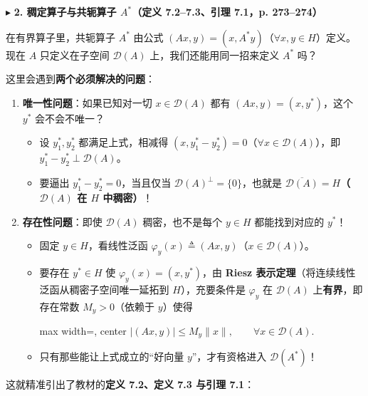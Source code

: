\documentclass[11pt,a4paper]{article}
\providecommand{\tightlist}{\setlength{\itemsep}{2pt}\setlength{\parskip}{0pt}}
\newcommand{\SubSubHeading}[1]{%
  \Needspace{6.5\baselineskip}\vspace{5.5pt}\noindent
  \textcolor{AccentMain}{\scriptsize$\blacktriangleright$}\hspace{4pt}%
  {\small\bfseries\color{AccentMain}#1}\par\nopagebreak[4]\vspace{2.5pt}%
}
\newcommand{\FitDisplayMath}[1]{%
  \par\vspace{4.5pt}\noindent
  \begin{adjustbox}{max width=\linewidth, center}
    $\displaystyle #1$
  \end{adjustbox}
  \par\vspace{4.5pt}%
}
\begin{document}
\SubSubHeading{2. 稠定算子与共轭算子 \(A^*\)（定义 7.2--7.3、引理 7.1，p. 273--274）}

在有界算子里，共轭算子 \(A^*\) 由公式 \((Ax, y) = (x, A^*y)\)（\(\forall x, y \in H\)）定义。现在 \(A\) 只定义在子空间 \(\mathcal{D}(A)\) 上，我们还能用同一招来定义 \(A^*\) 吗？

这里会遇到\textbf{两个必须解决的问题}：

\begin{enumerate}
\def\labelenumi{\arabic{enumi}.}
\tightlist
\item
  \textbf{唯一性问题}：如果已知对一切 \(x \in \mathcal{D}(A)\) 都有 \((Ax, y) = (x, y^*)\)，这个 \(y^*\) 会不会不唯一？

  \begin{itemize}
  \tightlist
  \item
    设 \(y_1^*, y_2^*\) 都满足上式，相减得 \((x, y_1^* - y_2^*) = 0\)（\(\forall x \in \mathcal{D}(A)\)），即 \(y_1^* - y_2^* \perp \mathcal{D}(A)\)。
  \item
    要逼出 \(y_1^* - y_2^* = 0\)，当且仅当 \(\mathcal{D}(A)^\perp = \{0\}\)，也就是 \textbf{\(\overline{\mathcal{D}(A)} = H\)（\(\mathcal{D}(A)\) 在 \(H\) 中稠密）}！
  \end{itemize}
\item
  \textbf{存在性问题}：即使 \(\mathcal{D}(A)\) 稠密，也不是每个 \(y \in H\) 都能找到对应的 \(y^*\)！

  \begin{itemize}
  \tightlist
  \item
    固定 \(y \in H\)，看线性泛函 \(\varphi_y(x) \triangleq (Ax, y)\)（\(x \in \mathcal{D}(A)\)）。
  \item
    要存在 \(y^* \in H\) 使 \(\varphi_y(x) = (x, y^*)\)，由 \textbf{Riesz 表示定理}（将连续线性泛函从稠密子空间唯一延拓到 \(H\)），充要条件是 \(\varphi_y\) 在 \(\mathcal{D}(A)\) 上\textbf{有界}，即存在常数 \(M_y > 0\)（依赖于 \(y\)）使得 
\FitDisplayMath{|(Ax, y)| \le M_y \|x\|, \qquad \forall x \in \mathcal{D}(A).}

  \item
    只有那些能让上式成立的``好向量 \(y\)''，才有资格进入 \(\mathcal{D}(A^*)\)！
  \end{itemize}
\end{enumerate}

这就精准引出了教材的\textbf{定义 7.2、定义 7.3 与引理 7.1}：
\end{document}
